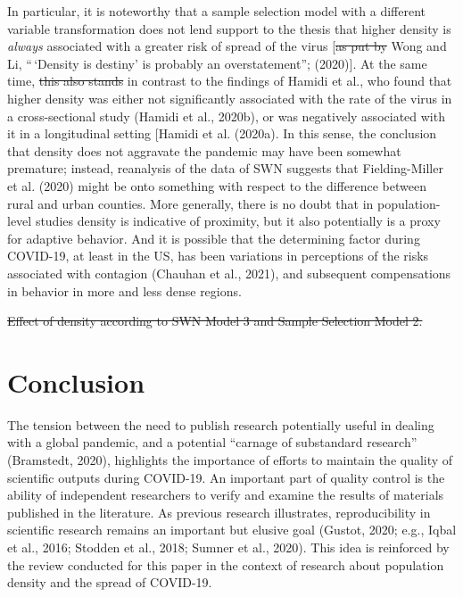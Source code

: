 \documentclass[]{elsarticle} %
\providecommand{\DIFaddtex}[1]{{\protect\color{blue}\uwave{#1}}} %
\providecommand{\DIFdeltex}[1]{{\protect\color{red}\sout{#1}}}                      %
\providecommand{\DIFaddbegin}{} %
\providecommand{\DIFaddend}{} %
\providecommand{\DIFdelbegin}{} %
\providecommand{\DIFdelend}{} %
\providecommand{\DIFdelFL}[1]{\DIFdel{#1}} %
\providecommand{\DIFadd}[1]{\texorpdfstring{\DIFaddtex{#1}}{#1}} %
\providecommand{\DIFdel}[1]{\texorpdfstring{\DIFdeltex{#1}}{}} %
\newcommand{\DIFscaledelfig}{0.5}
\newlength{\DIFdelgraphicswidth} %
\newlength{\DIFdelgraphicsheight} %
\newcommand{\DIFaddincludegraphics}[2][]{{\color{blue}\fbox{\DIFOincludegraphics[#1]{#2}}}} %
\newcommand{\DIFdelincludegraphics}[2][]{%
\sbox{\DIFdelgraphicsbox}{\DIFOincludegraphics[#1]{#2}}%
\settoboxwidth{\DIFdelgraphicswidth}{\DIFdelgraphicsbox} %
\settoboxtotalheight{\DIFdelgraphicsheight}{\DIFdelgraphicsbox} %
\scalebox{\DIFscaledelfig}{%
\parbox[b]{\DIFdelgraphicswidth}{\usebox{\DIFdelgraphicsbox}\\[-\baselineskip] \rule{\DIFdelgraphicswidth}{0em}}\llap{\resizebox{\DIFdelgraphicswidth}{\DIFdelgraphicsheight}{%
\setlength{\unitlength}{\DIFdelgraphicswidth}%
\begin{picture}(1,1)%
\thicklines\linethickness{2pt} %
{\color[rgb]{1,0,0}\put(0,0){\framebox(1,1){}}}%
{\color[rgb]{1,0,0}\put(0,0){\line( 1,1){1}}}%
{\color[rgb]{1,0,0}\put(0,1){\line(1,-1){1}}}%
\end{picture}%
}\hspace*{3pt}}} %
} %
\DeclareRobustCommand{\DIFaddbegin}{\DIFOaddbegin \let\includegraphics\DIFaddincludegraphics} %
\DeclareRobustCommand{\DIFaddend}{\DIFOaddend \let\includegraphics\DIFOincludegraphics} %
\DeclareRobustCommand{\DIFdelbegin}{\DIFOdelbegin \let\includegraphics\DIFdelincludegraphics} %
\DeclareRobustCommand{\DIFdelend}{\DIFOaddend \let\includegraphics\DIFOincludegraphics} %
\begin{document}
In particular, it is noteworthy that a sample selection model with a
different variable transformation does not lend support to the thesis
that higher density is \emph{always} associated with a greater risk of
spread of the virus {[}\DIFdelbegin \DIFdel{as put by }\DIFdelend \DIFaddbegin \DIFadd{in }\DIFaddend Wong and Li\DIFaddbegin \DIFadd{'s words}\DIFaddend , ``\,`Density is destiny'
is probably an overstatement''; (2020){]}. At the same time, \DIFdelbegin \DIFdel{this also stands }\DIFdelend \DIFaddbegin \DIFadd{the results
presented here also stand }\DIFaddend in contrast to the findings of Hamidi et al.,
who found that higher density was either not significantly associated
with the rate of the virus in a cross-sectional study (Hamidi et al.,
2020b), or was negatively associated with it in a longitudinal setting
{[}Hamidi et al. (2020a). In this sense, the conclusion that density
does not aggravate the pandemic may have been somewhat premature;
instead, reanalysis of the data of SWN suggests that Fielding-Miller et
al. (2020) might be onto something with respect to the difference
between rural and urban counties. More generally, there is no doubt that
in population-level studies density is indicative of proximity, but it
also potentially is a proxy for adaptive behavior. And it is possible
that the determining factor during COVID-19, at least in the US, has
been variations in perceptions of the risks associated with contagion
(Chauhan et al., 2021), and subsequent compensations in behavior in more
and less dense regions.

\DIFdelbegin %
{%
\DIFdelFL{Effect of density according to SWN Model 3 and Sample Selection Model 2.}}%

\DIFdelend \hypertarget{conclusion}{%
\section{Conclusion}\label{conclusion}}

The tension between the need to publish research potentially useful in
dealing with a global pandemic, and a potential ``carnage of substandard
research'' (Bramstedt, 2020), highlights the importance of efforts to
maintain the quality of scientific outputs during COVID-19. An important
part of quality control is the ability of independent researchers to
verify and examine the results of materials published in the literature.
As previous research illustrates, reproducibility in scientific research
remains an important but elusive goal (Gustot, 2020; e.g., Iqbal et al.,
2016; Stodden et al., 2018; Sumner et al., 2020). This idea is
reinforced by the review conducted for this paper in the context of
research about population density and the spread of COVID-19.
\end{document}

